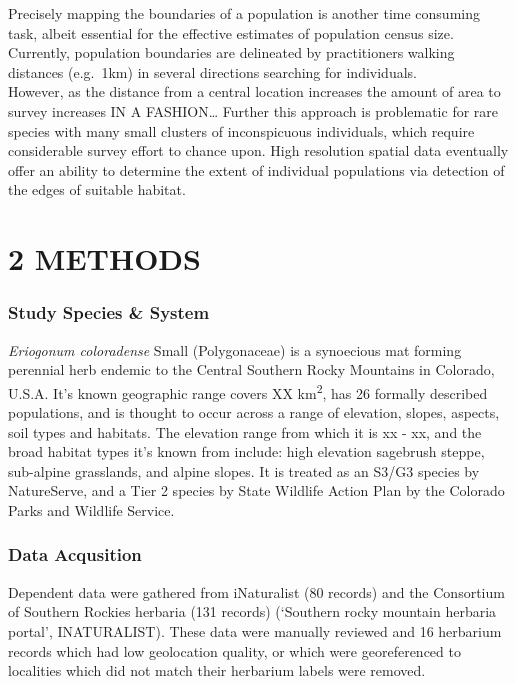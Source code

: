 \documentclass[
]{article}
\begin{document}
Precisely mapping the boundaries of a population is another time
consuming task, albeit essential for the effective estimates of
population census size. Currently, population boundaries are delineated
by practitioners walking distances (e.g.~1km) in several directions
searching for individuals.\\
However, as the distance from a central location increases the amount of
area to survey increases IN A FASHION\ldots{} Further this approach is
problematic for rare species with many small clusters of inconspicuous
individuals, which require considerable survey effort to chance upon.
High resolution spatial data eventually offer an ability to determine
the extent of individual populations via detection of the edges of
suitable habitat.

\hypertarget{methods}{%
\section{2 \textbar{} METHODS}\label{methods}}

\hypertarget{study-species-system}{%
\subsubsection{Study Species \& System}\label{study-species-system}}

\emph{Eriogonum coloradense} Small (Polygonaceae) is a synoecious mat
forming perennial herb endemic to the Central Southern Rocky Mountains
in Colorado, U.S.A. It's known geographic range covers XX
km\textsuperscript{2}, has 26 formally described populations, and is
thought to occur across a range of elevation, slopes, aspects, soil
types and habitats. The elevation range from which it is xx - xx, and
the broad habitat types it's known from include: high elevation
sagebrush steppe, sub-alpine grasslands, and alpine slopes. It is
treated as an S3/G3 species by NatureServe, and a Tier 2 species by
State Wildlife Action Plan by the Colorado Parks and Wildlife Service.

\hypertarget{data-acqusition}{%
\subsubsection{Data Acqusition}\label{data-acqusition}}

Dependent data were gathered from iNaturalist (80 records) and the
Consortium of Southern Rockies herbaria (131 records) ({`Southern rocky
mountain herbaria portal'}, INATURALIST). These data were manually
reviewed and 16 herbarium records which had low geolocation quality, or
which were georeferenced to localities which did not match their
herbarium labels were removed.
\end{document}
